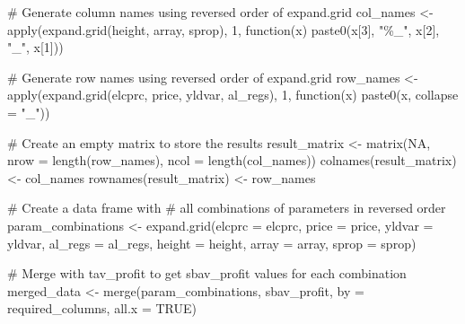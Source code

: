 \documentclass[
  letterpaper,
  DIV=11,
  numbers=noendperiod]{scrartcl}
\newenvironment{Shaded}{\begin{snugshade}}{\end{snugshade}}
\newcommand{\AttributeTok}[1]{\textcolor[rgb]{0.40,0.45,0.13}{#1}}
\newcommand{\CommentTok}[1]{\textcolor[rgb]{0.37,0.37,0.37}{#1}}
\newcommand{\ConstantTok}[1]{\textcolor[rgb]{0.56,0.35,0.01}{#1}}
\newcommand{\ControlFlowTok}[1]{\textcolor[rgb]{0.00,0.23,0.31}{#1}}
\newcommand{\DecValTok}[1]{\textcolor[rgb]{0.68,0.00,0.00}{#1}}
\newcommand{\FunctionTok}[1]{\textcolor[rgb]{0.28,0.35,0.67}{#1}}
\newcommand{\NormalTok}[1]{\textcolor[rgb]{0.00,0.23,0.31}{#1}}
\newcommand{\OtherTok}[1]{\textcolor[rgb]{0.00,0.23,0.31}{#1}}
\newcommand{\StringTok}[1]{\textcolor[rgb]{0.13,0.47,0.30}{#1}}
\begin{document}
\begin{Shaded}
\begin{Highlighting}[]
\CommentTok{\# Generate column names using reversed order of expand.grid}
\NormalTok{col\_names }\OtherTok{\textless{}{-}} \FunctionTok{apply}\NormalTok{(}\FunctionTok{expand.grid}\NormalTok{(height, array, sprop), }\DecValTok{1}\NormalTok{,}
                   \ControlFlowTok{function}\NormalTok{(x) }\FunctionTok{paste0}\NormalTok{(x[}\DecValTok{3}\NormalTok{], }\StringTok{"\%\_"}\NormalTok{, x[}\DecValTok{2}\NormalTok{], }\StringTok{"\_"}\NormalTok{, x[}\DecValTok{1}\NormalTok{]))}

\CommentTok{\# Generate row names using reversed order of expand.grid}
\NormalTok{row\_names }\OtherTok{\textless{}{-}} \FunctionTok{apply}\NormalTok{(}\FunctionTok{expand.grid}\NormalTok{(elcprc, }
\NormalTok{                               price,}
\NormalTok{                               yldvar, }
\NormalTok{                               al\_regs), }\DecValTok{1}\NormalTok{, }
                   \ControlFlowTok{function}\NormalTok{(x) }\FunctionTok{paste0}\NormalTok{(x, }\AttributeTok{collapse =} \StringTok{"\_"}\NormalTok{))}

\CommentTok{\# Create an empty matrix to store the results}
\NormalTok{result\_matrix }\OtherTok{\textless{}{-}} \FunctionTok{matrix}\NormalTok{(}\ConstantTok{NA}\NormalTok{, }\AttributeTok{nrow =} \FunctionTok{length}\NormalTok{(row\_names), }
                        \AttributeTok{ncol =} \FunctionTok{length}\NormalTok{(col\_names))}
\FunctionTok{colnames}\NormalTok{(result\_matrix) }\OtherTok{\textless{}{-}}\NormalTok{ col\_names}
\FunctionTok{rownames}\NormalTok{(result\_matrix) }\OtherTok{\textless{}{-}}\NormalTok{ row\_names}

\CommentTok{\# Create a data frame with}
\CommentTok{\# all combinations of parameters in reversed order}
\NormalTok{param\_combinations }\OtherTok{\textless{}{-}} \FunctionTok{expand.grid}\NormalTok{(}\AttributeTok{elcprc =}\NormalTok{ elcprc, }
                                  \AttributeTok{price =}\NormalTok{ price, }
                                  \AttributeTok{yldvar =}\NormalTok{ yldvar, }
                                  \AttributeTok{al\_regs =}\NormalTok{ al\_regs,}
                                  \AttributeTok{height =}\NormalTok{ height, }
                                  \AttributeTok{array =}\NormalTok{ array, }
                                  \AttributeTok{sprop =}\NormalTok{ sprop)}

\CommentTok{\# Merge with tav\_profit to get sbav\_profit values for each combination}
\NormalTok{merged\_data }\OtherTok{\textless{}{-}} \FunctionTok{merge}\NormalTok{(param\_combinations, }
\NormalTok{                     sbav\_profit, }
                     \AttributeTok{by =}\NormalTok{ required\_columns,}
                     \AttributeTok{all.x =} \ConstantTok{TRUE}\NormalTok{)}


\end{Highlighting}
\end{Shaded}
\end{document}
